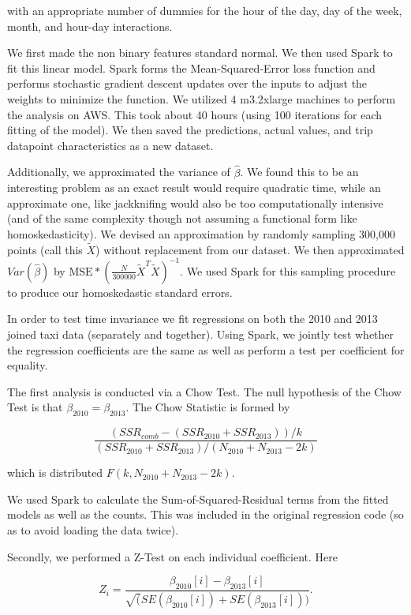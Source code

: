 \documentclass[twoside]{article}
\begin{document}
\begin{multicols}{2}
\noindent with an appropriate number of dummies for the hour of the day, day of the week, month, and hour-day interactions. 

We first made the non binary features standard normal. We then used Spark to fit this linear model. Spark forms the Mean-Squared-Error loss function and performs stochastic gradient descent updates over the inputs to adjust the weights to minimize the function. We utilized 4 m3.2xlarge machines to perform the analysis on AWS. This took about 40 hours (using 100 iterations for each fitting of the model). We then saved the predictions, actual values, and trip datapoint characteristics as a new dataset. 

Additionally, we approximated the variance of $\hat{\beta}$. We found this to be an interesting problem as an exact result would require quadratic time, while an approximate one, like jackknifing would also be too computationally intensive (and of the same complexity though not assuming a functional form like homoskedasticity).  We devised an approximation by randomly sampling 300,000 points (call this $\tilde{X}$) without replacement from our dataset. We then approximated $Var(\hat{\beta})$ by $\text{MSE}*(\frac{N}{300000}\tilde{X}^T\tilde{X})^{-1}$. We used Spark for this sampling procedure to produce our homoskedastic standard errors. 

In order to test time invariance we fit regressions on both the 2010 and 2013 joined taxi data (separately and together). Using Spark, we jointly test whether the regression coefficients are the same as well as perform a test per coefficient for equality. 

The first analysis is conducted via a Chow Test.  The null hypothesis of the Chow Test is that $\beta_{2010} = \beta_{2013}$.  The Chow Statistic is formed by 

$$\frac{(SSR_{comb} - (SSR_{2010} + SSR_{2013}))/k}{(SSR_{2010} + SSR_{2013})/(N_{2010} + N_{2013}-2k)}$$

\noindent which is distributed $F(k, N_{2010} + N_{2013}-2k)$. 

We used Spark to calculate the Sum-of-Squared-Residual terms from the fitted models as well as the counts. This was included in the original regression code (so as to avoid loading the data twice). 

Secondly, we performed a Z-Test on each individual coefficient. Here

$$ Z_i = \frac{\beta_{2010}[i] - \beta_{2013}[i]}{\sqrt(SE(\beta_{2010}[i]) + SE(\beta_{2013}[i]))}.$$

\end{multicols}
\end{document}
